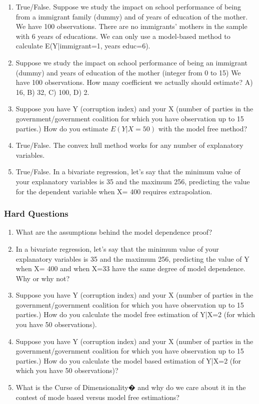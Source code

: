 \documentclass[11pt]{article}
\begin{document}
\begin{enumerate}

\item True/False. Suppose we study the impact on school performance of being from a immigrant family (dummy) and of years of education of the mother. We have 100 observations. There are no immigrants' mothers in the sample with  6 years of educations. We can only use a model-based method to calculate E(Y|immigrant=1, years educ=6).

\item Suppose we study the impact on school performance of being an immigrant  (dummy) and years of education of the mother (integer from 0 to 15) We have 100 observations. How many coefficient we actually should estimate? A) 16, B) 32, C) 100, D) 2. 

\item Suppose you have Y (corruption index) and your X (number of parties in the government/government coalition for which you have observation up to 15 parties.) How do you estimate $E(Y | X= 50)$ with the model free method?

\item True/False. The convex hull method works for any number of explanatory variables.

\item True/False. In a bivariate regression, let's say that the minimum value of your explanatory variables is 35 and the maximum 256, predicting the value for the dependent variable when X= 400 requires extrapolation.

\end{enumerate}



\subsubsection{Hard Questions}

\begin{enumerate}
\item What are the assumptions behind the model dependence proof?
\item In a bivariate regression, let's say that the minimum value of your explanatory variables is 35 and the maximum 256, predicting the value of Y when X= 400 and when X=33 have the same degree of model dependence. Why or why not?
\item Suppose you have Y (corruption index) and your X (number of parties in the government/government coalition for which you have observation up to 15 parties.) How do you calculate the model free estimation of Y|X=2 (for which you have 50 observations).
\item Suppose you have Y (corruption index) and your X (number of parties in the government/government coalition for which you have observation up to 15 parties.) How do you calculate the model based estimation of Y|X=2 (for which you have 50 observations)?
\item What is the Curse of Dimensionality� and why do we care about it in the contest of mode based versus model free estimations?

\end{enumerate}
\end{document}
